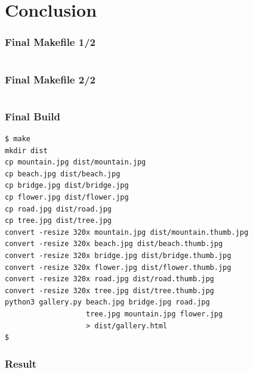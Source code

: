 \documentclass[xcolor=dvipsnames,t,compress]{beamer}
\begin{document}

\section{Conclusion}

\begin{frame}[fragile]
\frametitle{Final Makefile 1/2}
\vspace{-1em}
\inputminted[fontsize=\small,frame=single,tabsize=4,firstline=1,lastline=15]{make}{examples/final/Makefile}
\end{frame}

\begin{frame}[fragile]
\frametitle{Final Makefile 2/2}
\vspace{-1em}
\inputminted[fontsize=\small,frame=single,tabsize=4,firstline=16,lastline=27]{make}{examples/final/Makefile}
\end{frame}

\begin{frame}[fragile]
\frametitle{Final Build}
\begin{verbatim}
$ make
mkdir dist
cp mountain.jpg dist/mountain.jpg
cp beach.jpg dist/beach.jpg
cp bridge.jpg dist/bridge.jpg
cp flower.jpg dist/flower.jpg
cp road.jpg dist/road.jpg
cp tree.jpg dist/tree.jpg
convert -resize 320x mountain.jpg dist/mountain.thumb.jpg
convert -resize 320x beach.jpg dist/beach.thumb.jpg
convert -resize 320x bridge.jpg dist/bridge.thumb.jpg
convert -resize 320x flower.jpg dist/flower.thumb.jpg
convert -resize 320x road.jpg dist/road.thumb.jpg
convert -resize 320x tree.jpg dist/tree.thumb.jpg
python3 gallery.py beach.jpg bridge.jpg road.jpg
                   tree.jpg mountain.jpg flower.jpg
				   > dist/gallery.html
$
\end{verbatim}
\end{frame}

\begin{frame}
\frametitle{Result}
\begin{center}
\end{center}
\end{frame}
\end{document}
